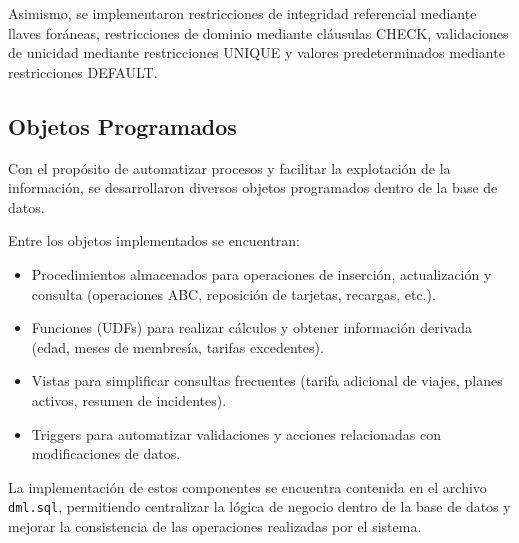 Asimismo, se implementaron restricciones de integridad referencial mediante llaves foráneas, restricciones de dominio mediante cláusulas CHECK, validaciones de unicidad mediante restricciones UNIQUE y valores predeterminados mediante restricciones DEFAULT.

\subsection{Objetos Programados}

Con el propósito de automatizar procesos y facilitar la explotación de la información, se desarrollaron diversos objetos programados dentro de la base de datos.

Entre los objetos implementados se encuentran:
\begin{itemize}
	\item Procedimientos almacenados para operaciones de inserción, actualización y consulta (operaciones ABC, reposición de tarjetas, recargas, etc.).
	\item Funciones (UDFs) para realizar cálculos y obtener información derivada (edad, meses de membresía, tarifas excedentes).
	\item Vistas para simplificar consultas frecuentes (tarifa adicional de viajes, planes activos, resumen de incidentes).
	\item Triggers para automatizar validaciones y acciones relacionadas con modificaciones de datos.
\end{itemize}

La implementación de estos componentes se encuentra contenida en el archivo \texttt{dml.sql}, permitiendo centralizar la lógica de negocio dentro de la base de datos y mejorar la consistencia de las operaciones realizadas por el sistema.
